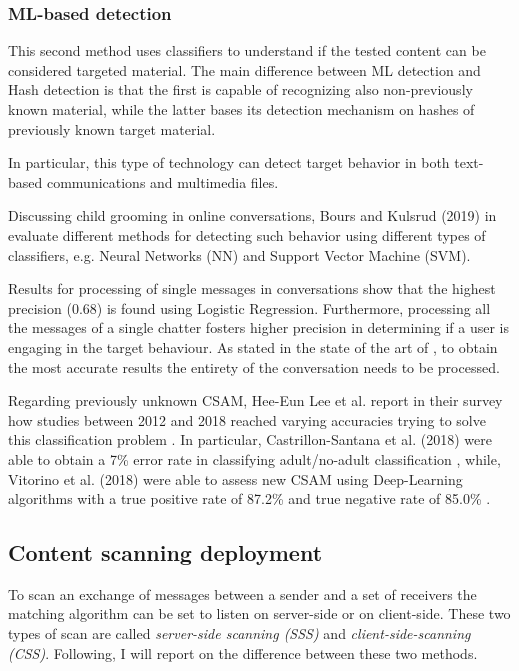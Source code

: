 \subsubsection{ML-based detection}
\label{sss:ML}

This second method uses classifiers to understand if the tested content can be considered targeted material. The main difference between ML detection and Hash detection is that the first is capable of recognizing also non-previously known material, while the latter bases its detection mechanism on hashes of previously known target material\cite{abelson2024bugs}. 

In particular, this type of technology can detect target behavior in both text-based communications and multimedia files.

Discussing child grooming in online conversations, Bours and Kulsrud (2019) in \cite{Bours} evaluate different methods for detecting such behavior using different types of classifiers, e.g. Neural Networks (NN) and Support Vector Machine (SVM). 

Results for processing of single messages in conversations show that the highest precision (0.68) is found using Logistic Regression. Furthermore, processing all the messages of a single chatter fosters higher precision in determining if a user is engaging in the target behaviour\cite{Bours}. As stated in the state of the art of \cite{Bours}, to obtain the most accurate results the entirety of the conversation needs to be processed.

Regarding previously unknown CSAM, Hee-Eun Lee et al. report in their survey how studies between 2012 and 2018 reached varying accuracies trying to solve this classification problem \cite{LEE2020301022}. In particular, Castrillon-Santana et al. (2018) were able to obtain a 7\% error rate in classifying adult/no-adult classification \cite{CASTRILLONSANTANA201810}, while, Vitorino et al. (2018) were able to assess new CSAM using Deep-Learning algorithms with a true positive rate of 87.2\% and true negative rate of 85.0\% \cite{VITORINO2018303}.

\subsection{Content scanning deployment}
\label{ss:scanning}

To scan an exchange of messages between a sender and a set of receivers the matching algorithm can be set to listen on server-side or on client-side. These two types of scan are called \textit{server-side scanning (SSS)} and \textit{client-side-scanning (CSS)}. Following, I will report on the difference between these two methods.

